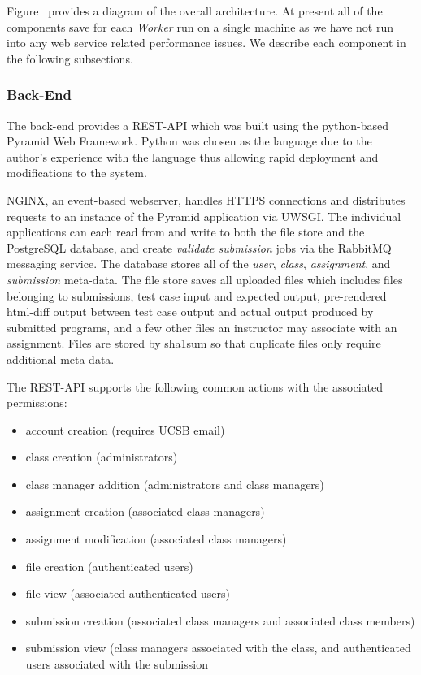 Figure~ provides a diagram of the overall
architecture. At present all of the components save for each \emph{Worker} run
on a single machine as we have not run into any web service related performance
issues. We describe each component in the following subsections.

\subsubsection{Back-End}
The back-end provides a REST-API which was built using the python-based Pyramid
Web Framework. Python was chosen as the language due to the author's experience
with the language thus allowing rapid deployment and modifications to the
system.

NGINX, an event-based webserver, handles HTTPS connections and distributes
requests to an instance of the Pyramid application via UWSGI. The individual
applications can each read from and write to both the file store and the
PostgreSQL database, and create \emph{validate submission} jobs via the
RabbitMQ messaging service. The database stores all of the \emph{user},
\emph{class}, \emph{assignment}, and \emph{submission} meta-data. The file
store saves all uploaded files which includes files belonging to submissions,
test case input and expected output, pre-rendered html-diff output between test
case output and actual output produced by submitted programs, and a few other
files an instructor may associate with an assignment. Files are stored by
sha1sum so that duplicate files only require additional meta-data.

The REST-API supports the following common actions with the associated
permissions:

\begin{itemize}
\item account creation (requires UCSB email)
\item class creation (administrators)
\item class manager addition (administrators and class managers)
\item assignment creation (associated class managers)
\item assignment modification (associated class managers)
\item file creation (authenticated users)
\item file view (associated authenticated users)
\item submission creation (associated class managers and associated class
  members)
\item submission view (class managers associated with the class, and
  authenticated users associated with the submission
\end{itemize}

